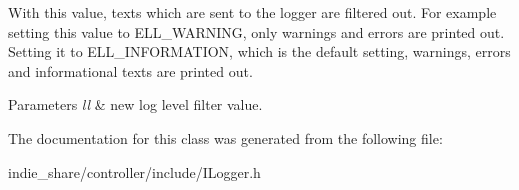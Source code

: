 With this value, texts which are sent to the logger are filtered out. For example setting this value to E\+L\+L\+\_\+\+W\+A\+R\+N\+I\+NG, only warnings and errors are printed out. Setting it to E\+L\+L\+\_\+\+I\+N\+F\+O\+R\+M\+A\+T\+I\+ON, which is the default setting, warnings, errors and informational texts are printed out. 
\begin{DoxyParams}{Parameters}
{\em ll} & new log level filter value. \\
\hline
\end{DoxyParams}


The documentation for this class was generated from the following file\+:\begin{DoxyCompactItemize}
\item 
indie\+\_\+share/controller/include/I\+Logger.\+h\end{DoxyCompactItemize}
